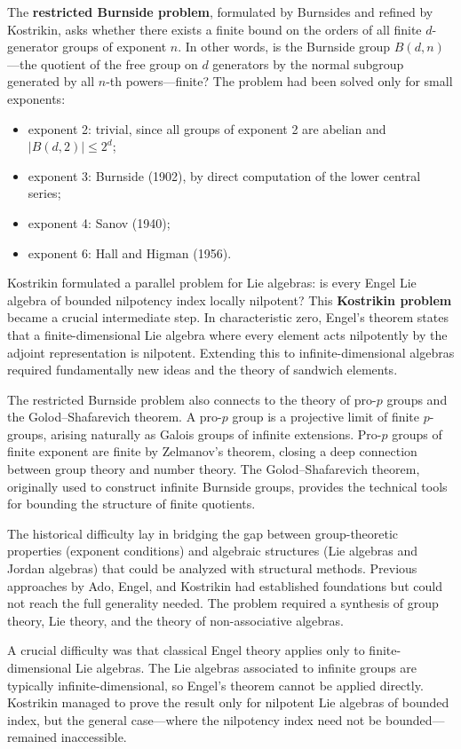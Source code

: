 The \textbf{restricted Burnside problem}, formulated by Burnsides
and refined by Kostrikin, asks whether there exists a finite bound
on the orders of all finite $d$-generator groups of exponent $n$.
In other words, is the Burnside group
$B(d,n)$---the quotient of the free group on $d$ generators by
the normal subgroup generated by all $n$-th powers---finite?
The problem had been solved only for small exponents:
\begin{itemize}
\item exponent 2: trivial, since all groups of exponent 2 are
      abelian and $|B(d,2)|\leq 2^{d}$;
\item exponent 3: Burnside (1902), by direct computation of the
      lower central series;
\item exponent 4: Sanov (1940);
\item exponent 6: Hall and Higman (1956).
\end{itemize}

Kostrikin formulated a parallel problem for Lie algebras: is every
Engel Lie algebra of bounded nilpotency index locally nilpotent?
This \textbf{Kostrikin problem} became a crucial intermediate step.
In characteristic zero, Engel's theorem states that a
finite-dimensional Lie algebra where every element acts nilpotently
by the adjoint representation is nilpotent.  Extending this to
infinite-dimensional algebras required fundamentally new ideas and
the theory of sandwich elements.

The restricted Burnside problem also connects to the theory of
pro-$p$ groups and the Golod--Shafarevich theorem.  A pro-$p$
group is a projective limit of finite $p$-groups, arising naturally
as Galois groups of infinite extensions.  Pro-$p$ groups of finite
exponent are finite by Zelmanov's theorem, closing a deep
connection between group theory and number theory.  The
Golod--Shafarevich theorem, originally used to construct infinite
Burnside groups, provides the technical tools for bounding the
structure of finite quotients.

The historical difficulty lay in bridging the gap between
group-theoretic properties (exponent conditions) and algebraic
structures (Lie algebras and Jordan algebras) that could be
analyzed with structural methods.  Previous approaches by Ado,
Engel, and Kostrikin had established foundations but could not
reach the full generality needed.  The problem required a synthesis
of group theory, Lie theory, and the theory of non-associative
algebras.

A crucial difficulty was that classical Engel theory applies only
to finite-dimensional Lie algebras.  The Lie algebras associated to
infinite groups are typically infinite-dimensional, so Engel's
theorem cannot be applied directly.  Kostrikin managed to prove the
result only for nilpotent Lie algebras of bounded index, but the
general case---where the nilpotency index need not be
bounded---remained inaccessible.

